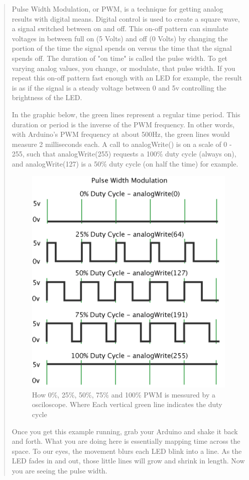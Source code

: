 \documentclass[a4paper,oneside, draft]{memoir}
\begin{document}
\begin{quotation}
  Pulse Width Modulation, or PWM, is a technique for getting analog
  results with digital means. Digital control is used to create a
  square wave, a signal switched between on and off. This on-off
  pattern can simulate voltages in between full on (5 Volts) and off
  (0 Volts) by changing the portion of the time the signal spends on
  versus the time that the signal spends off. The duration of "on
  time" is called the pulse width. To get varying analog values, you
  change, or modulate, that pulse width. If you repeat this on-off
  pattern fast enough with an LED for example, the result is as if the
  signal is a steady voltage between 0 and 5v controlling the
  brightness of the LED.

  In the graphic below, the green lines represent a regular time
  period. This duration or period is the inverse of the PWM
  frequency. In other words, with Arduino's PWM frequency at about
  500Hz, the green lines would measure 2 milliseconds each. A call to
  analogWrite() is on a scale of 0 - 255, such that analogWrite(255)
  requests a 100\% duty cycle (always on), and analogWrite(127) is a
  50\% duty cycle (on half the time) for example.

  
  \begin{figure}[h!]
    \centering
    \includegraphics[scale=0.8]{images/pwm}

    \caption{How 0\%, 25\%, 50\%, 75\% and 100\% PWM is messured by a
      osciloscope. Where Each vertical green line indicates the duty
      cycle}
    \label{fig:pwm}
  \end{figure}


  Once you get this example running, grab your Arduino and shake it
  back and forth. What you are doing here is essentially mapping time
  across the space. To our eyes, the movement blurs each LED blink
  into a line. As the LED fades in and out, those little lines will
  grow and shrink in length. Now you are seeing the pulse width.
\end{quotation}
\end{document}
